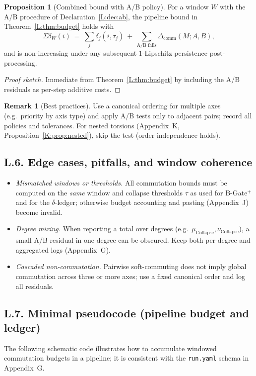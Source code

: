 \documentclass[11pt]{article}
\numberwithin{equation}{section}
\theoremstyle{plain}
\theoremstyle{definition}
\theoremstyle{remark}
\DeclareRobustCommand{\hyp}{\nobreakdash-}
\theoremstyle{plain}
\theoremstyle{definition}
\numberwithin{equation}{section}
\newtheorem{proposition}[theorem]{Proposition}
\theoremstyle{definition}
\newtheorem{remark}[theorem]{Remark}
\DeclareRobustCommand{\muc}{\mu_{\mathrm{Collapse}}}
\DeclareRobustCommand{\nuc}{\nu_{\mathrm{Collapse}}}
\numberwithin{equation}{section}
\theoremstyle{plain}
\theoremstyle{definition}
\theoremstyle{remark}
\providecommand{\muc}{\mu_{\mathrm{Collapse}}}
\providecommand{\nuc}{\nu_{\mathrm{Collapse}}}
\begin{document}
\begin{proposition}[Combined bound with A/B policy]\label{L:prop:combined}
For a window \(W\) with the A/B procedure of Declaration~\ref{L:dec:ab}, the pipeline bound in Theorem~\ref{L:thm:budget} holds with
\[
\Sigma\delta_W(i)\ =\ \sum_{j}\delta_j(i,\tau_j)\ +\ \sum_{\text{A/B fails}} \Delta_{\mathrm{comm}}(M;A,B),
\]
and is non\hyp increasing under any subsequent \(1\)\hyp Lipschitz persistence post\hyp processing.
\end{proposition}

\begin{proof}[Proof sketch]
Immediate from Theorem~\ref{L:thm:budget} by including the A/B residuals as per\hyp step additive costs.
\end{proof}

\begin{remark}[Best practices]
Use a canonical ordering for multiple axes (e.g.\ priority by axis type) and apply A/B tests only to adjacent pairs; record all policies and tolerances. For nested torsions (Appendix~K, Proposition~\ref{K:prop:nested}), skip the test (order independence holds).
\end{remark}

\subsection*{L.6. Edge cases, pitfalls, and window coherence}
\begin{itemize}\itemsep0.25em
  \item \emph{Mismatched windows or thresholds.} All commutation bounds must be computed on the \emph{same} window and collapse thresholds \(\tau\) as used for B-Gate\(^{+}\) and for the \(\delta\)\hyp ledger; otherwise budget accounting and pasting (Appendix~J) become invalid.
  \item \emph{Degree mixing.} When reporting a total over degrees (e.g.\ \(\muc,\nuc\)), a small A/B residual in one degree can be obscured. Keep both per\hyp degree and aggregated logs (Appendix~G).
  \item \emph{Cascaded non\hyp commutation.} Pairwise soft\hyp commuting does not imply global commutation across three or more axes; use a fixed canonical order and log all residuals.
\end{itemize}

\subsection*{L.7. Minimal pseudocode (pipeline budget and ledger)}
The following schematic code illustrates how to accumulate windowed commutation budgets in a pipeline; it is consistent with the \texttt{run.yaml} schema in Appendix~G.
\end{document}
